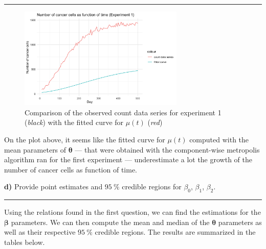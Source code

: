 \begin{center}\rule{6cm}{0.4pt}\end{center}

\begin{figure}[H]
	\centering
	\includegraphics[width=0.7\textwidth]{figures/metropolis_cw/metropolis_cw_fitted_curve.png}
	\caption{Comparison of the observed count data series for experiment 1 (\textit{black}) with the fitted curve for $\mu(t)$ (\textit{red})}
	\label{fig:metropolis-cv-fitted-curve}
\end{figure}

On the plot above, it seems like the fitted curve for $\mu(t)$ computed with the mean parameters of $\bm{\theta}$ --- that were obtained with the component-wise metropolis algorithm ran for the first experiment --- underestimate a lot the growth of the number of cancer cells as function of time.

\textbf{d)} Provide point estimates and $\SI{95}{\percent}$ credible regions for $\beta_0$, $\beta_1$, $\beta_2$.

\begin{center}\rule{6cm}{0.4pt}\end{center}

Using the relations found in the first question, we can find the estimations for the $\bm{\beta}$ parameters. We can then compute the mean and median of the $\bm{\theta}$ parameters as well as their respective $\SI{95}{\percent}$ credible regions.   The results are summarized in the tables below.

